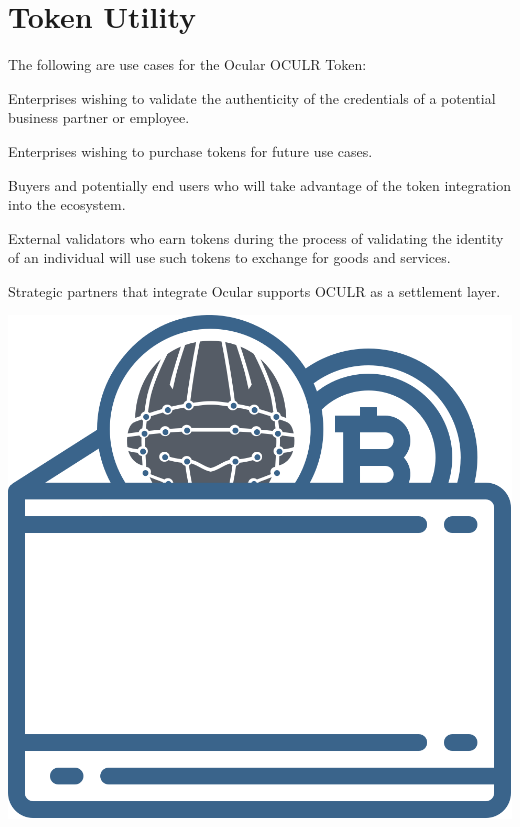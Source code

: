 \documentclass[a4paper]{article}
\let\tempone\itemize
\let\temptwo\enditemize
\renewenvironment{itemize}{\tempone\addtolength{\itemsep}{-5pt}}{\temptwo}
\begin{document}
\section{Token Utility}
The following are use cases for the Ocular OCULR Token: 
\begin{itemize}
  \item Enterprises wishing to validate the authenticity of the credentials of a potential business partner or employee.
  \item Enterprises wishing to purchase tokens for future use cases.
  \item Buyers and potentially end users who will take advantage of the token integration into the ecosystem.
  \item External validators who earn tokens during the process of validating the identity of an individual will use such tokens to exchange for goods and services.
  \item Strategic partners that integrate Ocular supports OCULR as a settlement layer. 
\end{itemize}


\centerline{\includegraphics[width=1.0\textwidth]{ocular-ewallet}}
\end{document}
